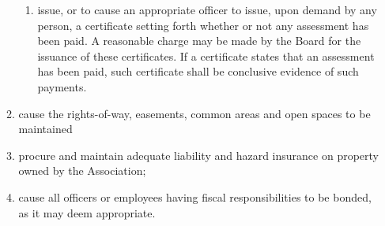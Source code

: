 \documentclass[12pt, letterpaper]{article}
\begin{document}
\begin{enumerate}
\begin{enumerate}
\begin{enumerate}
    \item issue, or to cause an appropriate officer to issue, upon demand by any person, a certificate setting forth whether or not any assessment has been paid.
     A reasonable charge may be made by the Board for the issuance of these certificates.
     If a certificate states that an assessment has been paid, such certificate shall be conclusive evidence of such payments.
   \end{enumerate}
   \item cause the rights-of-way, easements, common areas and open spaces to be maintained
   \item procure and maintain adequate liability and hazard insurance on property owned by the Association;
   \item cause all officers or employees having fiscal responsibilities to be bonded, as it may deem appropriate.
  \end{enumerate}
\end{enumerate}

\end{document}
